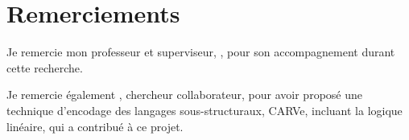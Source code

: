 %
\section*{Remerciements}
\label{sec::remerciements}

Je remercie mon professeur et superviseur, \thesisTeacher, pour son accompagnement durant cette recherche. 

Je remercie également \thesisContributor, chercheur collaborateur, pour avoir proposé une technique d'encodage des langages sous-structuraux, CARVe, incluant la logique linéaire, qui a contribué à ce projet.

